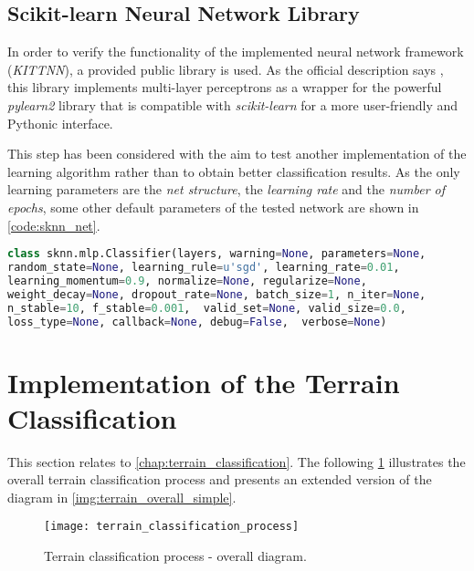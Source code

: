 \subsection*{Scikit-learn Neural Network Library} \label{ssec:sknn}
In order to verify the functionality of the implemented neural network framework (\textit{KITTNN}), a provided public library is used. As the official description says \citep{misc:sknn}, this library implements multi-layer perceptrons as a wrapper for the powerful \textit{pylearn2} library that is compatible with \textit{scikit-learn} for a more user-friendly and Pythonic interface.

This step has been considered with the aim to test another implementation of the learning algorithm rather than to obtain better classification results. As the only learning parameters are the \textit{net structure}, the \textit{learning rate} and the \textit{number of epochs}, some other default parameters of the tested network are shown in \cref{code:sknn_net}.

\begin{lstlisting}[language=Python, caption={Sknn classifier specification \citep{misc:sknn}}, label=code:sknn_net]
class sknn.mlp.Classifier(layers, warning=None, parameters=None, 
random_state=None, learning_rule=u'sgd', learning_rate=0.01, 
learning_momentum=0.9, normalize=None, regularize=None, 
weight_decay=None, dropout_rate=None, batch_size=1, n_iter=None, 
n_stable=10, f_stable=0.001,  valid_set=None, valid_size=0.0, 
loss_type=None, callback=None, debug=False,  verbose=None)
\end{lstlisting}

\newpage
\section{Implementation of the Terrain Classification} \label{app:sec:implementation_of_terrain_classification}
This section relates to \cref{chap:terrain_classification}. The following \cref{img:app:terrain_classification_process} illustrates the overall terrain classification process and presents an extended version of the diagram in \cref{img:terrain_overall_simple}.

\begin{figure}[H]
  \centering
  \texttt{[image: terrain\_classification\_process]}
  \caption{Terrain classification process - overall diagram.}
  \label{img:app:terrain_classification_process}
\end{figure}


